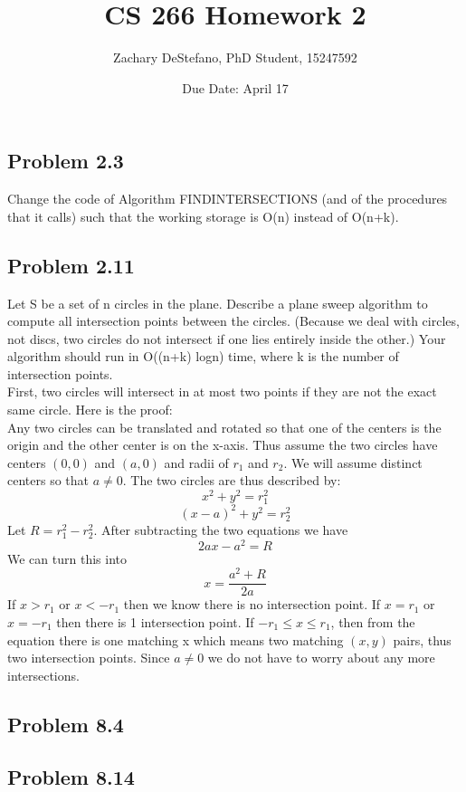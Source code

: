 \documentclass[11pt,psfig]{article}
\begin{document}
\setlength{\parskip}{1.2ex plus0.3ex minus 0.3ex}


\thispagestyle{empty} \pagestyle{myheadings} 



\title{CS 266 Homework 2}
\author{Zachary DeStefano, PhD Student, 15247592}
\date{Due Date: April 17}

\maketitle

\vfill\eject

\subsection*{Problem 2.3}

Change the code of Algorithm FINDINTERSECTIONS (and of the procedures
that it calls) such that the working storage is O(n) instead of
O(n+k).


\subsection*{Problem 2.11}

Let S be a set of n circles in the plane. Describe a plane sweep algorithm to compute all intersection points between the circles. (Because we deal with circles, not discs, two circles do not intersect if one lies entirely
inside the other.) Your algorithm should run in O((n+k) logn) time,
where k is the number of intersection points.
\\
First, two circles will intersect in at most two points if they are not the exact same circle. Here is the proof:
\\
Any two circles can be translated and rotated so that one of the centers is the origin and the other center is on the x-axis. Thus assume the two circles have centers $(0,0)$ and $(a,0)$ and radii of $r_1$ and $r_2$. We will assume distinct centers so that $a \neq 0$. The two circles are thus described by:\\
\[
x^2 + y^2 = r_1^2
\]
\[
(x-a)^2 + y^2 = r_2^2
\]
Let $R=r_1^2-r_2^2$. After subtracting the two equations we have
\[
2ax - a^2 = R
\]
We can turn this into
\[
x = \frac{a^2 + R}{2a}
\]
If $x>r_1$ or $x < -r_1$ then we know there is no intersection point. If $x=r_1$ or $x=-r_1$ then there is 1 intersection point. If $-r_1 \leq x \leq r_1$, then from the equation there is one matching x which means two matching $(x,y)$ pairs, thus two intersection points. Since $a \neq 0$ we do not have to worry about any more intersections. 

\subsection*{Problem 8.4}

\subsection*{Problem 8.14}


\end{document}
